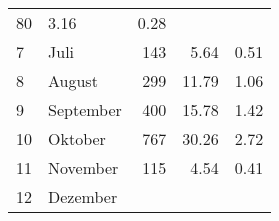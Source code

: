 \begin{longtable}{lXrrr}
       \num{80} &
       \num[round-mode=places,round-precision=2]{3.16} &
         \num[round-mode=places,round-precision=2]{0.28} \\

     7 &
     \multicolumn{1}{X}{ Juli   } &


       \num{143} &
       \num[round-mode=places,round-precision=2]{5.64} &
         \num[round-mode=places,round-precision=2]{0.51} \\

     8 &
     \multicolumn{1}{X}{ August   } &


       \num{299} &
       \num[round-mode=places,round-precision=2]{11.79} &
         \num[round-mode=places,round-precision=2]{1.06} \\

     9 &
     \multicolumn{1}{X}{ September   } &


       \num{400} &
       \num[round-mode=places,round-precision=2]{15.78} &
         \num[round-mode=places,round-precision=2]{1.42} \\

     10 &
     \multicolumn{1}{X}{ Oktober   } &


       \num{767} &
       \num[round-mode=places,round-precision=2]{30.26} &
         \num[round-mode=places,round-precision=2]{2.72} \\

     11 &
     \multicolumn{1}{X}{ November   } &


       \num{115} &
       \num[round-mode=places,round-precision=2]{4.54} &
         \num[round-mode=places,round-precision=2]{0.41} \\

     12 &
     \multicolumn{1}{X}{ Dezember   } &



\end{longtable}
